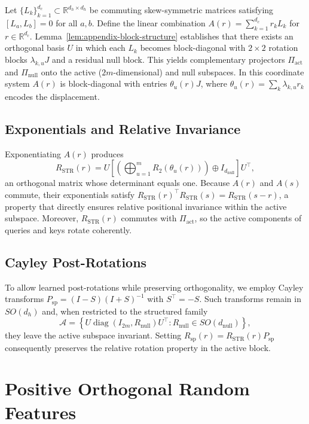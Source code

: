 \documentclass[11pt]{article}
\newcommand{\Real}{\mathbb{R}}
\begin{document}
Let $\{L_k\}_{k=1}^{d_c} \subset \Real^{d_h \times d_h}$ be commuting skew-symmetric matrices satisfying
$[L_a,L_b] = 0$ for all $a,b$. Define the linear combination $A(r) = \sum_{k=1}^{d_c} r_k L_k$ for
$r \in \Real^{d_c}$. Lemma~\ref{lem:appendix-block-structure} establishes that there exists an orthogonal basis $U$ in which each
$L_k$ becomes block-diagonal with $2\times 2$ rotation blocks $\lambda_{k,u} J$ and a residual null
block. This yields complementary projectors $\Pi_{\mathrm{act}}$ and $\Pi_{\mathrm{null}}$ onto the active
($2m$-dimensional) and null subspaces. In this coordinate system $A(r)$ is block-diagonal with
entries $\theta_u(r) J$, where $\theta_u(r) = \sum_k \lambda_{k,u} r_k$ encodes the displacement.

\subsection{Exponentials and Relative Invariance}

Exponentiating $A(r)$ produces
\[
R_{\mathrm{STR}}(r) = U \left[\left(\bigoplus_{u=1}^m R_2(\theta_u(r))\right) \oplus I_{d_{\mathrm{null}}}\right] U^\top,
\]
an orthogonal matrix whose determinant equals one. Because $A(r)$ and $A(s)$ commute, their
exponentials satisfy $R_{\mathrm{STR}}(r)^\top R_{\mathrm{STR}}(s) = R_{\mathrm{STR}}(s-r)$, a property
that directly ensures relative positional invariance within the active subspace. Moreover,
$R_{\mathrm{STR}}(r)$ commutes with $\Pi_{\mathrm{act}}$, so the active components of queries and keys
rotate coherently.

\subsection{Cayley Post-Rotations}

To allow learned post-rotations while preserving orthogonality, we employ Cayley transforms
$P_{\mathrm{sp}} = (I-S)(I+S)^{-1}$ with $S^\top = -S$. Such transforms remain in $SO(d_h)$ and,
when restricted to the structured family
\[
\mathcal{A} = \left\{U \operatorname{diag}(I_{2m}, R_{\mathrm{null}}) U^\top: R_{\mathrm{null}}\in SO(d_{\mathrm{null}})\right\},
\]
they leave the active subspace invariant. Setting $R_{\mathrm{sp}}(r) = R_{\mathrm{STR}}(r) P_{\mathrm{sp}}$
consequently preserves the relative rotation property in the active block.

\section{Positive Orthogonal Random Features}
\label{sec:favor-structured}
\end{document}
